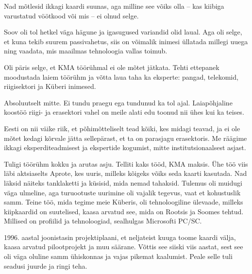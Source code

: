 
Nad mõtlesid ikkagi kaardi suunas, aga milline see võiks olla -- 
kas kiibiga varustatud vöötkood või mis -- ei olnud selge. 


Soov oli tol hetkel väga hägune ja igasugused 
variandid olid laual. Aga oli selge, et kuna tekib suurem 
passivahetus, siis on võimalik inimesi üllatada millegi uuega ning vaadata, mis 
maailmas tehnoloogia vallas toimub. 

Oli päris selge, et KMA 
töörühmal ei ole mõtet jätkata. Tehti ettepanek moodustada 
laiem töörühm ja võtta laua taha ka eksperte: pangad, 
telekomid, riigisektori ja Küberi inimesed.


Absoluutselt mitte. Ei tundu praegu ega tundunud ka tol ajal. 
Laiapõhjaline koostöö riigi- ja erasektori vahel on meile alati edu 
toonud nii ühes kui ka teises. 


Eesti on nii väike riik, et põhimõtteliselt tead kõiki, kes midagi teavad, ja 
ei ole mõtet kedagi kõrvale jätta sellepärast, et ta on parasjagu erasektoris. Me räägime ikkagi eksperditeadmisest ja 
ekspertide kogumist, mitte institutsionaalsest asjast. 

Tuligi töörühm kokku ja arutas asju. Telliti kaks tööd, 
KMA maksis. Ühe töö viis läbi 
aktsiaselts Aprote, kes uuris, milleks kõigeks 
võiks seda kaarti kasutada. Nad läksid näiteks tanklaketti ja küsisid, 
mida nemad tahaksid. Tulemus oli muidugi väga ulmeline, aga turuootuste uurimine oli 
vajalik tegevus, vaat et kohustuslik samm. 
Teine töö, mida tegime meie Küberis, oli 
tehnoloogiline ülevaade, milleks kiipkaardid on suutelised, kaasa
arvatud see, mida on Rootsis ja Soomes tehtud. 
Millised on profiilid ja tehnoloogiad, sealhulgas Microsofti 
PC/SC. 

1996. aastal joonistasin projektiplaani, et neljateist kuuga 
toome kaardi välja, kaasa arvatud pilootprojekt ja muu säärane. Võttis see siiski viis 
aastat, sest see oli väga oluline samm ühiskonnas 
ja vajas pikemat kaalumist. Peale selle tuli seadusi juurde ja ringi teha. 

